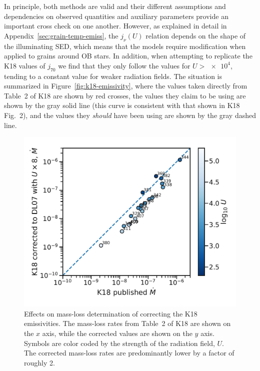 In principle, both methods are valid and their different assumptions
and dependencies on observed quantities and auxiliary parameters
provide an important cross check on one another.  However, as
explained in detail in Appendix~\ref{sec:grain-temp-emiss}, the
\(j_\nu(U)\) relation depends on the shape of the illuminating SED,
which means that the \citet{Draine:2007a} models require modification
when applied to grains around OB stars.  In addition, when attempting
to replicate the K18 values of \(j_{70}\) we find that they only
follow the \citet{Draine:2007a} values for \(U > \num{e4}\), tending
to a constant value for weaker radiation fields.  The situation is
summarized in Figure~\ref{fig:k18-emissivity}, where the values taken
directly from Table~2 of K18 are shown by red crosses, the values they
claim to be using are shown by the gray solid line (this curve is
consistent with that shown in K18 Fig.~2), and the values they
\textit{should} have been using are shown by the gray dashed line.


\begin{figure}
  \centering
  \includegraphics[width=\linewidth]{figs/K18-mdot-Ux8-comparison}
  \caption{Effects on mass-loss determination of correcting the K18
    emissivities.  The mass-loss rates from Table~2 of K18 are shown
    on the \(x\) axis, while the corrected values are shown on the
    \(y\) axis.  Symbols are color coded by the strength of the
    radiation field, \(U\). The corrected mass-loss rates are
    predominantly lower by a factor of roughly 2.}
  \label{fig:k18-mdot-corrected-emissivity}
\end{figure}

